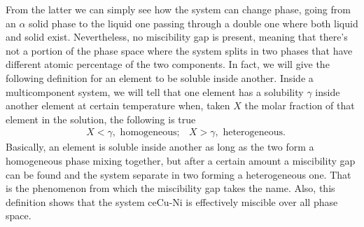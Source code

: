 From the latter we can simply see how the system can change phase, going from an $\alpha$ solid phase to the liquid one passing through a double one where both liquid and solid exist. Nevertheless, no miscibility gap is present, meaning that there's not a portion of the phase space where the system splits in two phases that have different atomic percentage of the two components. In fact, we will give the following definition for an element to be soluble inside another.
{
    Inside a multicomponent system, we will tell that one element has a solubility $\gamma$ inside another element at certain temperature when, taken $X$ the molar fraction of that element in the solution, the following is true
    \begin{align}
        &X < \gamma,\text{ homogeneous}; &X > \gamma,\text{ heterogeneous}.
    \end{align}
}
\noindent
Basically, an element is soluble inside another as long as the two form a homogeneous phase mixing together, but after a certain amount a miscibility gap can be found and the system separate in two forming a heterogeneous one. That is the phenomenon from which the miscibility gap takes the name. Also, this definition shows that the system ce{Cu-Ni} is effectively miscible over all phase space.

